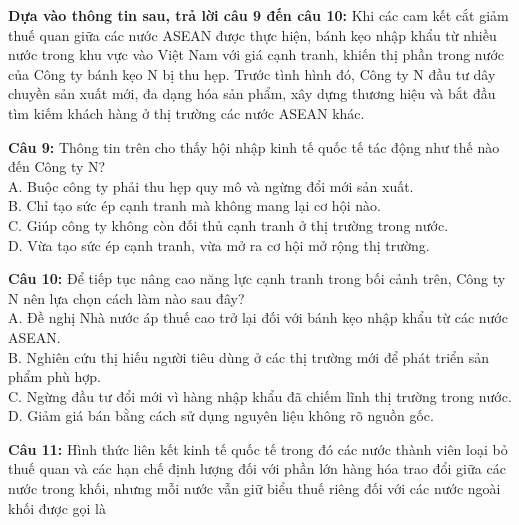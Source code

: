 \documentclass[12pt,a4paper]{article}
\begin{document}
\noindent \textbf{Dựa vào thông tin sau, trả lời câu 9 đến câu 10:} Khi các cam kết cắt giảm thuế quan giữa các nước ASEAN được thực hiện, bánh kẹo nhập khẩu từ nhiều nước trong khu vực vào Việt Nam với giá cạnh tranh, khiến thị phần trong nước của Công ty bánh kẹo N bị thu hẹp. Trước tình hình đó, Công ty N đầu tư dây chuyền sản xuất mới, đa dạng hóa sản phẩm, xây dựng thương hiệu và bắt đầu tìm kiếm khách hàng ở thị trường các nước ASEAN khác.

\noindent \textbf{Câu 9:} Thông tin trên cho thấy hội nhập kinh tế quốc tế tác động như thế nào đến Công ty N?\\
\noindent A. Buộc công ty phải thu hẹp quy mô và ngừng đổi mới sản xuất.\\
\noindent B. Chỉ tạo sức ép cạnh tranh mà không mang lại cơ hội nào.\\
\noindent C. Giúp công ty không còn đối thủ cạnh tranh ở thị trường trong nước.\\
\noindent D. Vừa tạo sức ép cạnh tranh, vừa mở ra cơ hội mở rộng thị trường.

\noindent \textbf{Câu 10:} Để tiếp tục nâng cao năng lực cạnh tranh trong bối cảnh trên, Công ty N nên lựa chọn cách làm nào sau đây?\\
\noindent A. Đề nghị Nhà nước áp thuế cao trở lại đối với bánh kẹo nhập khẩu từ các nước ASEAN.\\
\noindent B. Nghiên cứu thị hiếu người tiêu dùng ở các thị trường mới để phát triển sản phẩm phù hợp.\\
\noindent C. Ngừng đầu tư đổi mới vì hàng nhập khẩu đã chiếm lĩnh thị trường trong nước.\\
\noindent D. Giảm giá bán bằng cách sử dụng nguyên liệu không rõ nguồn gốc.

\noindent \textbf{Câu 11:} Hình thức liên kết kinh tế quốc tế trong đó các nước thành viên loại bỏ thuế quan và các hạn chế định lượng đối với phần lớn hàng hóa trao đổi giữa các nước trong khối, nhưng mỗi nước vẫn giữ biểu thuế riêng đối với các nước ngoài khối được gọi là\\
\noindent{}\\
\noindent{}
\end{document}
